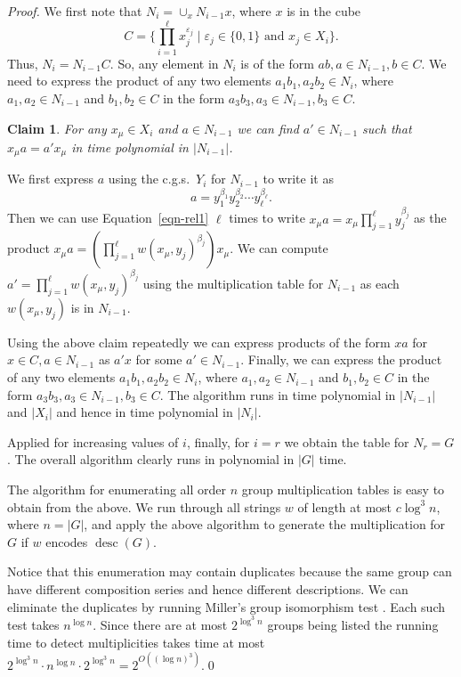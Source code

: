 \documentclass{elsarticle}
\newtheorem{claim}[theorem]{Claim}
\newcommand{\desc}{\mathop{\mathrm{desc}}}
\begin{document}
\begin{proof}
We first note that $N_i = \cup_x N_{i-1}x$, where $x$ is in the cube
\[C=\{\prod_{i=1}^\ell x_j^{\varepsilon_j}\mid \varepsilon_j\in
\{0,1\}\textrm{ and } x_j\in X_i\}.\]
Thus, $N_i=N_{i-1}C$. So, any element in $N_i$ is of the
form $ab, a\in N_{i-1}, b\in C$. We need to express the product of any
two elements $a_1b_1, a_2b_2\in N_i$, where $a_1,a_2\in N_{i-1}$ and
$b_1,b_2\in C$ in the form $a_3b_3, a_3\in N_{i-1}, b_3\in C$.

\begin{claim}
  For any $x_\mu\in X_i$ and $a\in N_{i-1}$ we can find $a'\in N_{i-1}$
  such that $x_\mu a = a' x_\mu$ in time polynomial in $|N_{i-1}|$.
\end{claim}

\begin{poc}
We first express $a$ using the c.g.s.\ $Y_i$ for
  $N_{i-1}$ to write it as
  \[
  a=y_1^{\beta_1}y_2^{\beta_2}\cdots y_\ell^{\beta_\ell}.
  \]
  Then we can use Equation~\eqref{eqn-rel1} $\ell$ times to write $x_\mu
  a = x_\mu \prod_{j=1}^\ell y_j^{\beta_j}$ as the product $x_\mu a =
  (\prod_{j=1}^\ell w(x_\mu,y_j)^{\beta_j})x_\mu$. We can compute $a'=
  \prod_{j=1}^\ell w(x_\mu,y_j)^{\beta_j}$ using the multiplication
  table for $N_{i-1}$ as each $w(x_\mu,y_j)$ is in $N_{i-1}$.
\end{poc}

Using the above claim repeatedly we can express products of the form
$x a$ for $x\in C, a\in N_{i-1}$ as $a' x$ for some $a'\in
N_{i-1}$. Finally, we can express the product of any two elements
$a_1b_1, a_2b_2\in N_i$, where $a_1,a_2\in N_{i-1}$ and $b_1,b_2\in C$
in the form $a_3b_3, a_3\in N_{i-1}, b_3\in C$.  The algorithm runs in
time polynomial in $|N_{i-1}|$ and $|X_i|$ and hence in time
polynomial in $|N_i|$.

Applied for increasing values of $i$, finally, for $i=r$ we obtain the
table for $N_r=G$. The overall algorithm clearly runs in polynomial in
$|G|$ time.

The algorithm for enumerating all order $n$ group multiplication
tables is easy to obtain from the above. We run through all strings
$w$ of length at most $c\log^3 n$, where $n=|G|$, and apply the above algorithm
to generate the multiplication for $G$ if $w$ encodes $\desc(G)$.

Notice that this enumeration may contain duplicates because the same
group can have different composition series and hence different
descriptions. We can eliminate the duplicates by running Miller's
group isomorphism test \cite{Mi78}. Each such test takes $n^{\log
  n}$. Since there are at most $2^{\log^3 n}$ groups being listed the
running time to detect multiplicities takes time at most $2^{\log^3
  n}\cdot n^{\log n}\cdot 2^{\log^3 n}=2^{O((\log n)^3)}$.\qed
\end{proof}
\end{document}
